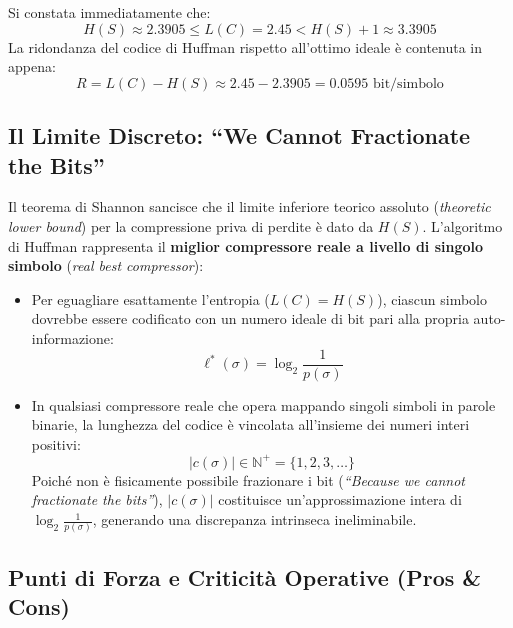 Si constata immediatamente che:
\begin{equation}
  H(S) \approx 2.3905 \le L(C) = 2.45 < H(S) + 1 \approx 3.3905
\end{equation}
La ridondanza del codice di Huffman rispetto all'ottimo ideale \`e contenuta in appena:
\begin{equation}
  R = L(C) - H(S) \approx 2.45 - 2.3905 = 0.0595\text{ bit/simbolo}
\end{equation}

\FloatBarrier
\subsection{Il Limite Discreto: ``We Cannot Fractionate the Bits''}
\label{subsec:frazionamento-bit}

Il teorema di Shannon sancisce che il limite inferiore teorico assoluto (\textit{theoretic lower bound}) per la compressione priva di perdite \`e dato da $H(S)$. L'algoritmo di Huffman rappresenta il \textbf{miglior compressore reale a livello di singolo simbolo} (\textit{real best compressor}):
\begin{itemize}
  \item Per eguagliare esattamente l'entropia ($L(C) = H(S)$), ciascun simbolo dovrebbe essere codificato con un numero ideale di bit pari alla propria auto-informazione:
  \begin{equation}
    \ell^*(\sigma) = \log_2 \frac{1}{p(\sigma)}
  \end{equation}
  \item In qualsiasi compressore reale che opera mappando singoli simboli in parole binarie, la lunghezza del codice \`e vincolata all'insieme dei numeri interi positivi:
  \begin{equation}
    \vert c(\sigma) \vert \in \mathbb{N}^+ = \{1, 2, 3, \dots\}
  \end{equation}
  Poich\'e non \`e fisicamente possibile frazionare i bit (\textit{``Because we cannot fractionate the bits''}), $\vert c(\sigma) \vert$ costituisce un'approssimazione intera di $\log_2 \frac{1}{p(\sigma)}$, generando una discrepanza intrinseca ineliminabile.
\end{itemize}

\FloatBarrier
\subsection{Punti di Forza e Criticit\`a Operative (Pros \& Cons)}
\label{subsec:pro-cons-huffman}

